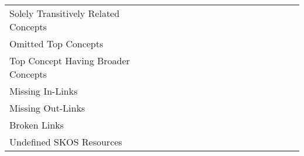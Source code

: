 \begin{table}[h]
\begin{tabular}{p{4cm}ccccccccccccccc}
Solely Transitively Related Concepts &&&&&&&&&&&&&&& \\

Omitted Top Concepts &&&&&&&&&&&&&&& \\

Top Concept Having Broader Concepts &&&&&&&&&&&&&&& \\

\midrule

Missing In-Links &&&&&&&&&&&&&&& \\

Missing Out-Links &&&&&&&&&&&&&&& \\

Broken Links &&&&&&&&&&&&&&& \\


Undefined SKOS Resources &&&&&&&&&&&&&&& \\

\bottomrule
\end{tabular}
\end{table}


% 

